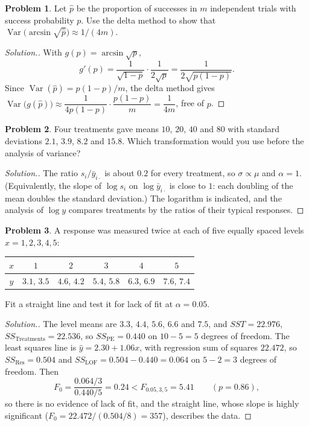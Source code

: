 \documentclass[11pt,a4paper]{article}
\numberwithin{equation}{section}
\DeclareMathOperator{\Var}{Var}
\theoremstyle{definition}
\newtheorem{problemx}{Problem}[subsection]
\newenvironment{problem}{\begin{problemx}}{\end{problemx}}
\newenvironment{solution}
  {\renewcommand{\qedsymbol}{}\begin{proof}[\textit{Solution}.]}
  {\end{proof}}
\begin{document}
\begin{problem}
Let $\hat p$ be the proportion of successes in $m$ independent trials with success probability $p$. Use the delta method to show that
$\Var\bigl(\arcsin\sqrt{\hat p}\bigr) \approx 1/(4m)$.
\end{problem}

\begin{solution}
With $g(p) = \arcsin\sqrt p$,
\[
g'(p) = \frac{1}{\sqrt{1 - p}}\cdot\frac{1}{2\sqrt p} = \frac{1}{2\sqrt{p(1 - p)}} .
\]
Since $\Var(\hat p) = p(1 - p)/m$, the delta method gives $\Var\bigl(g(\hat p)\bigr) \approx \dfrac{1}{4p(1 - p)}\cdot\dfrac{p(1 - p)}{m} = \dfrac{1}{4m}$, free of $p$.
\end{solution}

\begin{problem}
Four treatments gave means $10$, $20$, $40$ and $80$ with standard deviations $2.1$, $3.9$, $8.2$ and $15.8$. Which transformation would you use before the
analysis of variance?
\end{problem}

\begin{solution}
The ratio $s_i/\bar y_{i\cdot}$ is about $0.2$ for every treatment, so $\sigma \propto \mu$ and $\alpha = 1$. (Equivalently, the slope of $\log s_i$ on $\log\bar y_{i\cdot}$ is close to $1$:
each doubling of the mean doubles the standard deviation.) The logarithm is indicated, and the analysis of $\log y$ compares treatments by the
ratios of their typical responses.
\end{solution}

\begin{problem}
A response was measured twice at each of five equally spaced levels $x = 1, 2, 3, 4, 5$:
\begin{center}
\begin{tabular}{c|ccccc}
$x$ & $1$ & $2$ & $3$ & $4$ & $5$ \\
\hline
$y$ & $3.1$, $3.5$ & $4.6$, $4.2$ & $5.4$, $5.8$ & $6.3$, $6.9$ & $7.6$, $7.4$
\end{tabular}
\end{center}
Fit a straight line and test it for lack of fit at $\alpha = 0.05$.
\end{problem}

\begin{solution}
The level means are $3.3$, $4.4$, $5.6$, $6.6$ and $7.5$, and $SST = 22.976$, $SS_{\mathrm{Treatments}} = 22.536$, so $SS_{\mathrm{PE}} = 0.440$ on $10 - 5 = 5$ degrees of freedom. The
least squares line is $\hat y = 2.30 + 1.06x$, with regression sum of squares $22.472$, so $SS_{\mathrm{Res}} = 0.504$ and $SS_{\mathrm{LOF}} = 0.504 - 0.440 = 0.064$ on $5 - 2 = 3$
degrees of freedom. Then
\[
F_0 = \frac{0.064/3}{0.440/5} = 0.24 < F_{0.05,3,5} = 5.41 \qquad (p = 0.86) ,
\]
so there is no evidence of lack of fit, and the straight line, whose slope is highly significant ($F_0 = 22.472/(0.504/8) = 357$), describes the data.
\end{solution}
\end{document}
